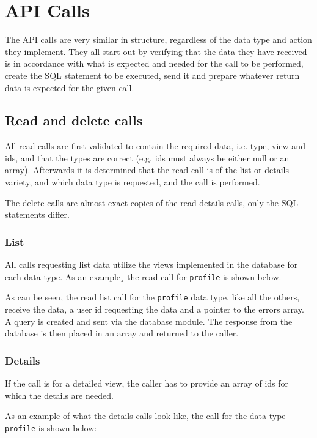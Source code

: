 \section{API Calls}
The API calls are very similar in structure, regardless of the data type and action they implement. They all start out by verifying that the data they have received is in accordance with what is expected and needed for the call to be performed, create the SQL statement to be executed, send it and prepare whatever return data is expected for the given call. 

\subsection{Read and delete calls}
All read calls are first validated to contain the required data, i.e. type, view and ids, and that the types are correct (e.g. ids must always be either null or an array). Afterwards it is determined that the read call is of the list or details variety, and which data type is requested, and the call is performed.

The delete calls are almost exact copies of the read details calls, only the SQL-statements differ.

\subsubsection{List}
All calls requesting list data utilize the views implemented in the database for each data type. As an example¸ the read call for \lstinline|profile| is shown below.



As can be seen, the read list call for the \lstinline|profile| data type, like all the others, receive the data, a user id requesting the data and a pointer to the errors array. A query is created and sent via the database module. The response from the database is then placed in an array and returned to the caller. 

\subsubsection{Details}
If the call is for a detailed view, the caller has to provide an array of ids for which the details are needed. 

As an example of what the details calls look like, the call for the data type \lstinline|profile| is shown below:

